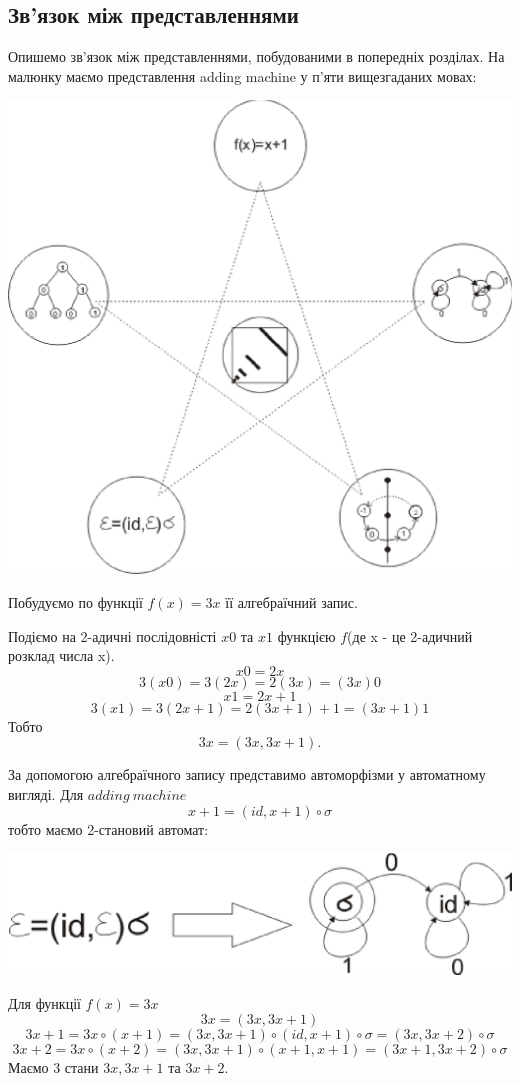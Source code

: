 \documentclass[a4paper,12pt]{article} \usepackage{a4wide}
\numberwithin{equation}{subsection}
\begin{document}
\subsection{Зв'язок між  представленнями}
 Опишемо зв'язок між  представленнями, побудованими в попередніх розділах.
  На малюнку маємо представлення adding machine у п'яти вищезгаданих мовах:

\begin{center}
\includegraphics[scale=0.8]{5mov.eps}
\end{center}

Побудуємо по функції $f(x)=3x$ її алгебраїчний запис.

Подіємо на 2-адичні послідовністі $ x0$ та $x1$ функцією $f$(де x - це 2-адичний розклад числа x).
$$x0=2x$$ $$ 3(x0)=3(2x)=2(3x)=(3x)0$$
$$x1=2x+1$$ $$ 3(x1)=3(2x+1)=2(3x+1)+1=(3x+1)1$$
Тобто $$3x=(3x,3x+1).$$

За допомогою алгебраїчного запису представимо автоморфізми у автоматному вигляді.
Для $adding \  machine$ $$x+1=(id,x+1)\circ \sigma$$ тобто маємо 2-становий автомат:

 \begin{center}
\includegraphics[scale=0.8]{alg_to_auto.eps}
\end{center}
Для функції $f(x)=3x$
$$3x=(3x,3x+1)$$
$$3x+1=3x\circ (x+1)=(3x,3x+1)\circ (id,x+1)\circ \sigma=(3x,3x+2)\circ \sigma$$
$$3x+2=3x\circ (x+2)=(3x,3x+1)\circ (x+1,x+1)=(3x+1,3x+2)\circ \sigma$$
Маємо 3 стани $3x,3x+1$ та $3x+2$.
\end{document}
